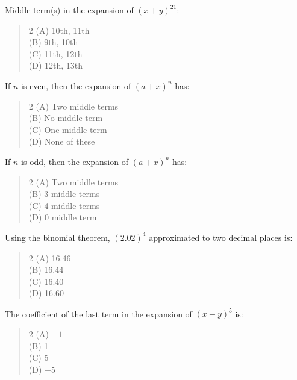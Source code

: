 \documentclass[11pt,a4paper]{article}
\begin{document}
\begin{mcqlist}
\item Middle term(s) in the expansion of $(x+y)^{21}$:
\begin{quote}\begin{multicols}{2}
\noindent (A) 10th, 11th \\
(B) 9th, 10th \\
(C) 11th, 12th \\
(D) 12th, 13th
\end{multicols}\end{quote}

\item If $n$ is even, then the expansion of $(a+x)^n$ has:
\begin{quote}\begin{multicols}{2}
\noindent (A) Two middle terms \\
(B) No middle term \\
(C) One middle term \\
(D) None of these
\end{multicols}\end{quote}

\item If $n$ is odd, then the expansion of $(a+x)^n$ has:
\begin{quote}\begin{multicols}{2}
\noindent (A) Two middle terms \\
(B) 3 middle terms \\
(C) 4 middle terms \\
(D) 0 middle term
\end{multicols}\end{quote}

\item Using the binomial theorem, $(2.02)^4$ approximated to two decimal places is:
\begin{quote}\begin{multicols}{2}
\noindent (A) 16.46 \\
(B) 16.44 \\
(C) 16.40 \\
(D) 16.60
\end{multicols}\end{quote}

\item The coefficient of the last term in the expansion of $(x-y)^5$ is:
\begin{quote}\begin{multicols}{2}
\noindent (A) $-1$ \\
(B) 1 \\
(C) 5 \\
(D) $-5$
\end{multicols}\end{quote}


\end{mcqlist}
\end{document}
